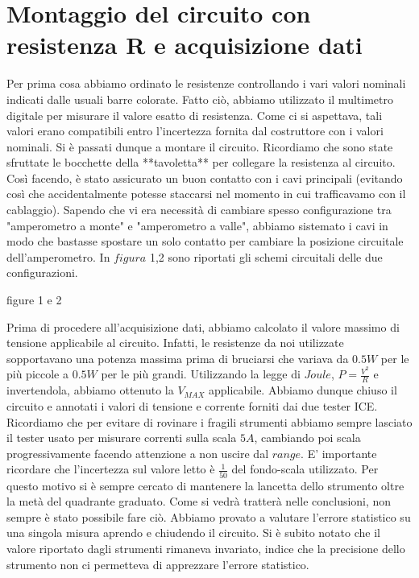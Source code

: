 \section{Montaggio del circuito con resistenza R e acquisizione dati}
Per prima cosa abbiamo ordinato le resistenze controllando i vari valori nominali indicati dalle usuali barre colorate.
Fatto ciò, abbiamo utilizzato il multimetro digitale per misurare il valore esatto di resistenza. Come ci si aspettava, tali valori erano compatibili entro l'incertezza fornita dal costruttore con i valori nominali.
Si è passati dunque a montare il circuito. Ricordiamo che sono state sfruttate le bocchette della **tavoletta** per collegare la resistenza al circuito. Così facendo, è stato assicurato un buon contatto con i cavi principali (evitando così che accidentalmente potesse staccarsi nel momento in cui trafficavamo con il cablaggio).
Sapendo che vi era necessità di cambiare spesso configurazione tra "amperometro a monte" e "amperometro a valle", abbiamo sistemato i cavi in modo che bastasse spostare un solo contatto per cambiare la posizione circuitale dell'amperometro. In $figura$ 1,2 sono riportati gli schemi circuitali delle due configurazioni.

\begin{center}{figure 1 e 2}
\end{center}

Prima di procedere all'acquisizione dati, abbiamo calcolato il valore massimo di tensione applicabile al circuito. Infatti, le resistenze da noi utilizzate sopportavano una potenza massima prima di bruciarsi che variava da $0.5W$ per le più piccole a $0.5W$ per le più grandi. Utilizzando la legge di $Joule$, $P=\frac{V^2}{R}$ e invertendola, abbiamo ottenuto la $V_{MAX}$ applicabile.
Abbiamo dunque chiuso il circuito e annotati i valori di tensione e corrente forniti dai due tester ICE. Ricordiamo che per evitare di rovinare i fragili strumenti abbiamo sempre lasciato il tester usato per misurare correnti sulla scala $5A$, cambiando poi scala progressivamente facendo attenzione a non uscire dal $range$. E' importante ricordare che l'incertezza sul valore letto è $\frac{1}{50}$ del fondo-scala utilizzato. Per questo motivo si è sempre cercato di mantenere la lancetta dello strumento oltre la metà del quadrante graduato. Come si vedrà tratterà nelle conclusioni, non sempre è stato possibile fare ciò. Abbiamo provato a valutare l'errore statistico su una singola misura aprendo e chiudendo il circuito. Si è subito notato che il valore riportato dagli strumenti rimaneva invariato, indice che la precisione dello strumento non ci permetteva di apprezzare l'errore statistico.

